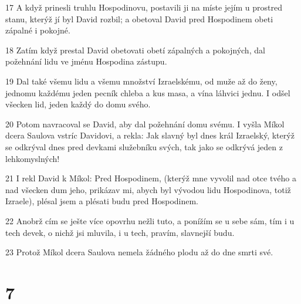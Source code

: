 \par 17 A když prinesli truhlu Hospodinovu, postavili ji na míste jejím u prostred stanu, kterýž jí byl David rozbil; a obetoval David pred Hospodinem obeti zápalné i pokojné.
\par 18 Zatím když prestal David obetovati obetí zápalných a pokojných, dal požehnání lidu ve jménu Hospodina zástupu.
\par 19 Dal také všemu lidu a všemu množství Izraelskému, od muže až do ženy, jednomu každému jeden pecník chleba a kus masa, a vína láhvici jednu. I odšel všecken lid, jeden každý do domu svého.
\par 20 Potom navracoval se David, aby dal požehnání domu svému. I vyšla Míkol dcera Saulova vstríc Davidovi, a rekla: Jak slavný byl dnes král Izraelský, kterýž se odkrýval dnes pred devkami služebníku svých, tak jako se odkrývá jeden z lehkomyslných!
\par 21 I rekl David k Míkol: Pred Hospodinem, (kterýž mne vyvolil nad otce tvého a nad všecken dum jeho, prikázav mi, abych byl vývodou lidu Hospodinova, totiž Izraele), plésal jsem a plésati budu pred Hospodinem.
\par 22 Anobrž cím se ješte více opovrhu nežli tuto, a ponížím se u sebe sám, tím i u tech devek, o nichž jsi mluvila, i u tech, pravím, slavnejší budu.
\par 23 Protož Míkol dcera Saulova nemela žádného plodu až do dne smrti své.

\chapter{7}


